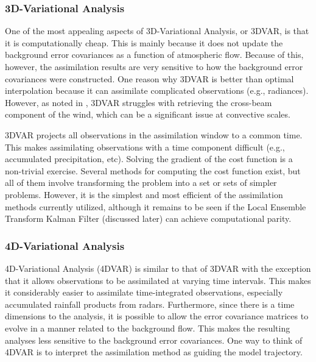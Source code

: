 \subsubsection{3D-Variational Analysis}

One of the most appealing aspects of 3D-Variational Analysis, or 3DVAR,  is that it is computationally cheap. This is mainly because it does not update the background error covariances as a function of atmospheric flow. Because of this, however, the assimilation results are very sensitive to how the background error covariances were constructed. One reason why 3DVAR is better than optimal interpolation because it can assimilate complicated observations (e.g., radiances). However, as noted in \cite{sun2005challenges}, 3DVAR struggles with retrieving the cross-beam component of the wind, which can be a significant issue at convective scales.


3DVAR projects all observations in the assimilation window to a common time. This makes assimilating observations with a time component difficult (e.g., accumulated precipitation, etc). Solving the gradient of the cost function is a non-trivial exercise. Several methods for computing the cost function exist, but all of them involve transforming the problem into a set or sets of simpler problems.  However, it is the simplest and most efficient of the assimilation methods currently utilized, although it remains to be seen if the Local Ensemble Transform Kalman Filter (discussed later) can achieve computational parity.




\subsubsection{4D-Variational Analysis}

4D-Variational Analysis (4DVAR) is similar to that of 3DVAR with the exception that it allows observations to be assimilated at varying time intervals. This makes it considerably easier to assimilate time-integrated observations, especially accumulated rainfall products from radars. Furthermore, since there is a time dimensions to the analysis, it is possible to allow the error covariance matrices to evolve in a manner related to the background flow. This makes the resulting analyses less sensitive to the background error covariances. One way to think of 4DVAR is to interpret the assimilation method as guiding the model trajectory.


